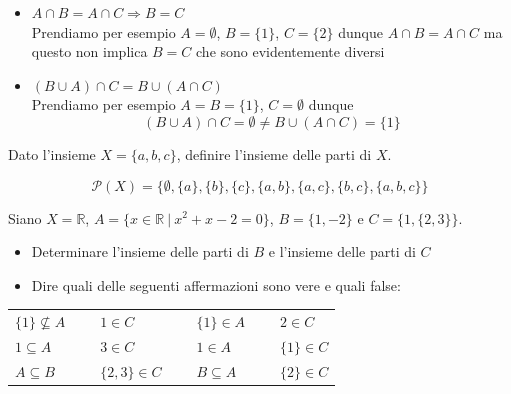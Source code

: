 \begin{soluzione}
\begin{itemize}
    \item $A\cap B = A \cap C\Rightarrow B = C$\\
    Prendiamo per esempio $A=\emptyset$, $B=\{1\}$, $C=\{2\}$ dunque $A\cap B = A\cap C$ ma questo non implica $B=C$ che sono evidentemente diversi
    \item $(B\cup A)\cap C = B\cup (A\cap C)$\\
    Prendiamo per esempio $A=B=\{1\}$, $C=\emptyset$ dunque 
    $$(B\cup A)\cap C = \emptyset \neq B\cup (A\cap C) = \{1\}$$
\end{itemize}
\end{soluzione}


\begin{esercizio}
Dato l'insieme $X = \{ a, b, c \}$, definire l'insieme delle parti di $X$.
\end{esercizio}

\begin{soluzione}
\[
\mathcal{P}(X) = \{ \emptyset, \{ a \}, \{ b \}, \{ c \}, \{ a,b \}, \{ a,c \}, \{ b,c \}, \{ a, b, c \} \}
\]
\end{soluzione}


\begin{esercizio}
Siano $X=\mathbb{R}$, $A=\{x\in\mathbb{R} ~|~ x^2+x-2=0\}$, $B=\{1, -2\}$ e $C=\{1, \{2,3\}\}$.
\begin{itemize}
    \item Determinare  l'insieme delle parti di $B$ e l'insieme delle parti di $C$
    \item Dire quali delle seguenti affermazioni sono vere e quali false:\\
\end{itemize}

\begin{center}
    \begin{tabular}{lclclcl}
        \medskip
        $\{1\}\not\subseteq A $ &~& $1\in C$       &~& $\{1\}\in A$   &~& $2\in C$\\
        \medskip
        $1\subseteq A$          &~& $3\in C$       &~& $1\in A$       &~& $\{1\}\in C$\\
        \medskip
        $A\subseteq B$          &~& $\{2,3\}\in C$ &~& $B\subseteq A$ &~& $\{2\}\in C$\\
    \end{tabular}
\end{center}
\end{esercizio}

